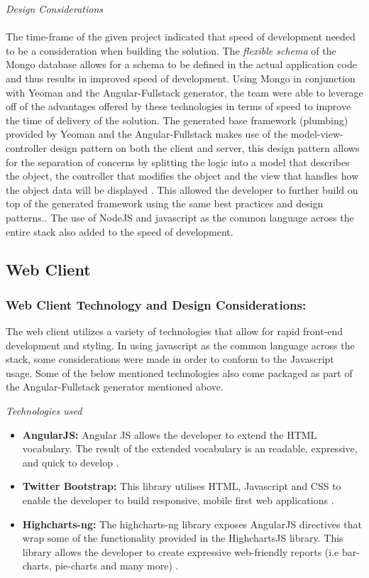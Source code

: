 \documentclass[12pt]{witseiepaper}
\begin{document}
\textit{Design Considerations} \\\\
The time-frame of the given project indicated that speed of development needed to be a consideration when building the solution. The \textit{flexible schema} of the Mongo database allows for a schema to be defined in the actual application code and thus results in improved speed of development. Using Mongo in conjunction with Yeoman and the Angular-Fullstack generator, the team were able to leverage off of the advantages offered by these technologies in terms of speed to improve the time of delivery of the solution. The generated base framework (plumbing) provided by Yeoman and the Angular-Fullstack makes use of the model-view-controller design pattern on both the client and server, this design pattern allows for the separation of concerns by splitting the logic into a model that describes the object, the controller that modifies the object and the view that handles how the object data will be displayed \cite{MVC}. This allowed the developer to further build on top of the generated framework using the same best practices and design patterns.. The use of NodeJS and javascript as the common language across the entire stack also added to the speed of development.

\subsection{Web Client}
\subsubsection{Web Client Technology and Design Considerations:}
The web client utilizes a variety of technologies that allow for rapid front-end development and styling. In using javascript as the common language across the stack, some considerations were made in order to conform to the Javascript usage. Some of the below mentioned technologies also come packaged as part of the Angular-Fullstack generator mentioned above.

\textit{Technologies used}
\begin{itemize}
	\item \textbf{AngularJS:} Angular JS allows the developer to extend the HTML vocabulary. The result of the extended vocabulary is an readable, expressive,  and quick to develop \cite{AngularJS}.
	\item \textbf{Twitter Bootstrap:} This library utilises HTML, Javascript and CSS to enable the developer to build responsive, mobile first web applications \cite{TwitterBootstrap}.
	\item \textbf{Highcharts-ng:} The highcharts-ng library exposes AngularJS directives that wrap some of the functionality provided in the HighchartsJS library. This library allows the developer to create expressive web-friendly reports (i.e bar-charts, pie-charts and many more) \cite{HighchartsNg}.
\end{itemize}
\end{document}

